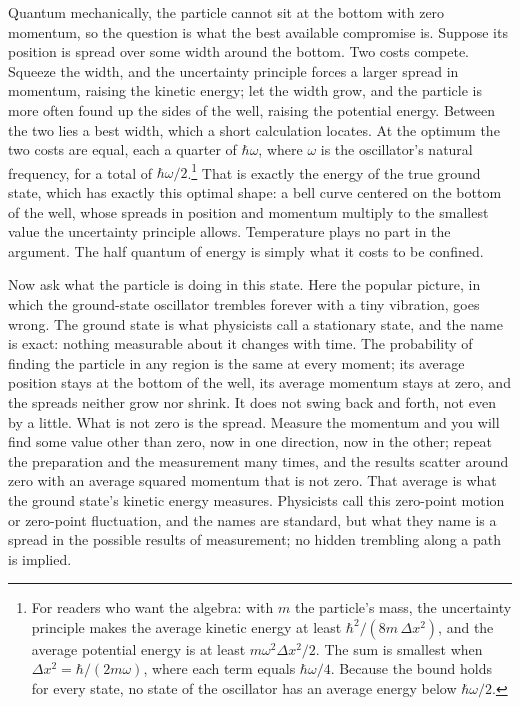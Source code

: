 Quantum mechanically, the particle cannot sit at the bottom with zero momentum, so the question is what the best available compromise is. Suppose its position is spread over some width around the bottom. Two costs compete. Squeeze the width, and the uncertainty principle forces a larger spread in momentum, raising the kinetic energy; let the width grow, and the particle is more often found up the sides of the well, raising the potential energy. Between the two lies a best width, which a short calculation locates. At the optimum the two costs are equal, each a quarter of $\hbar\omega$, where $\omega$ is the oscillator's natural frequency, for a total of $\hbar\omega/2$.\footnote{For readers who want the algebra: with $m$ the particle's mass, the uncertainty principle makes the average kinetic energy at least $\hbar^2/(8m\,\Delta x^2)$, and the average potential energy is at least $m\omega^2\Delta x^2/2$. The sum is smallest when $\Delta x^2 = \hbar/(2m\omega)$, where each term equals $\hbar\omega/4$. Because the bound holds for every state, no state of the oscillator has an average energy below $\hbar\omega/2$.} That is exactly the energy of the true ground state, which has exactly this optimal shape: a bell curve centered on the bottom of the well, whose spreads in position and momentum multiply to the smallest value the uncertainty principle allows. Temperature plays no part in the argument. The half quantum of energy is simply what it costs to be confined.

Now ask what the particle is doing in this state. Here the popular picture, in which the ground-state oscillator trembles forever with a tiny vibration, goes wrong. The ground state is what physicists call a stationary state, and the name is exact: nothing measurable about it changes with time. The probability of finding the particle in any region is the same at every moment; its average position stays at the bottom of the well, its average momentum stays at zero, and the spreads neither grow nor shrink. It does not swing back and forth, not even by a little. What is not zero is the spread. Measure the momentum and you will find some value other than zero, now in one direction, now in the other; repeat the preparation and the measurement many times, and the results scatter around zero with an average squared momentum that is not zero. That average is what the ground state's kinetic energy measures. Physicists call this zero-point motion or zero-point fluctuation, and the names are standard, but what they name is a spread in the possible results of measurement; no hidden trembling along a path is implied.


